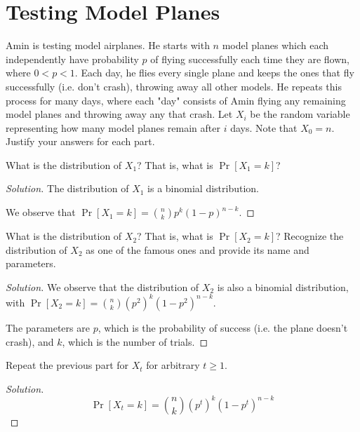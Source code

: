 \documentclass{article}
\newenvironment{solution}{\begin{proof}[Solution]}{\end{proof}}
\begin{document}
\section{Testing Model Planes}
Amin is testing model airplanes. He starts with $n$ model planes which each independently have probability $p$ of flying successfully each time they are flown, where $0<p<1$. Each day, he flies every single plane and keeps the ones that fly successfully (i.e. don't crash), throwing away all other models. He repeats this process for many days, where each "day" consists of Amin flying any remaining model planes and throwing away any that crash. Let $X_i$ be the random variable representing how many model planes remain after $i$ days. Note that $X_0 = n$. Justify your answers for each part.

\begin{hw}
	What is the distribution of $X_1$? That is, what is $\Pr[X_1=k]$? 
\end{hw}
\begin{solution}
	The distribution of $X_{1}$ is a binomial distribution.
	
	We observe that $\Pr[X_{1} = k] = \binom{n}{k} p^{k} (1-p)^{n-k}$.
\end{solution}

\begin{hw}
	What is the distribution of $X_2$? That is, what is $\Pr[X_2=k]$? Recognize the distribution of $X_2$ as one of the famous ones and provide its name and parameters.
\end{hw}
\begin{solution}
	We observe that the distribution of $X_{2}$ is also a binomial distribution, with $\Pr[X_{2} = k] = \binom{n}{k} \left( p^{2} \right)^{k} (1-p^{2})^{n-k}$.
	
	The parameters are $p$, which is the probability of success (i.e. the plane doesn't crash), and $k$, which is the number of trials.
\end{solution}

\begin{hw}
	Repeat the previous part for $X_t$ for arbitrary $t \geq 1$.
\end{hw}
\begin{solution}
	\begin{equation*}
		\Pr[X_{t} = k] = \binom{n}{k} (p^{t})^{k} (1-p^{t})^{n-k}
	\end{equation*}
\end{solution}
\end{document}
